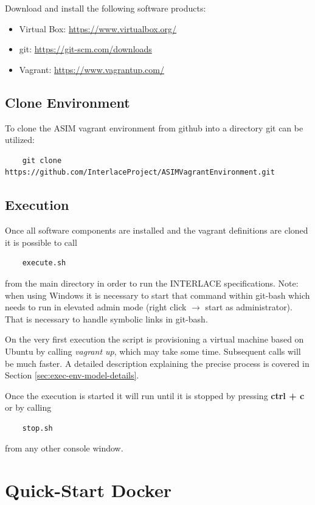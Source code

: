 Download and install the following software products:
\begin{itemize}
	\item Virtual Box: \url{https://www.virtualbox.org/}
	\item git: \url{https://git-scm.com/downloads}
	\item Vagrant: \url{https://www.vagrantup.com/}
\end{itemize}

\subsection{Clone Environment}

To clone the ASIM vagrant environment from github into a directory git can be utilized:
\begin{lstlisting}
	git clone https://github.com/InterlaceProject/ASIMVagrantEnvironment.git
\end{lstlisting}

\subsection{Execution}

Once all software components are installed and the vagrant definitions are cloned it is possible to call

\begin{lstlisting}
	execute.sh
\end{lstlisting}

from the main directory in order to run the INTERLACE specifications. Note: when using Windows it is necessary to start that command within git-bash which needs to run in elevated admin mode (right click $\rightarrow$ start as administrator). That is necessary to handle symbolic links in git-bash.

On the very first execution the script is provisioning a virtual machine based on Ubuntu by calling \textit{vagrant up}, which may take some time. Subsequent calls will be much faster. A detailed description explaining the precise process is covered in Section \ref{sec:exec-env-model-details}.

Once the execution is started it will run until it is stopped by pressing \textbf{ctrl + c} or by calling
\begin{lstlisting}
	stop.sh
\end{lstlisting}
from any other console window.

\section{Quick-Start Docker}
\label{sec:quick-start-docker}

